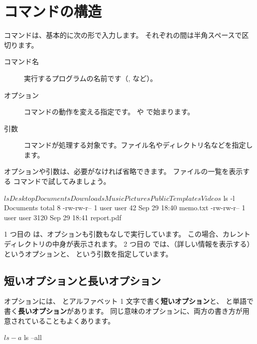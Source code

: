\section{コマンドの構造}
\label{sec:terminal-command-structure}

コマンドは、基本的に次の形で入力します。
それぞれの間は半角スペースで区切ります。
\begin{terminal}[コマンドの基本形]

\begin{description}
  \item[コマンド名] 実行するプログラムの名前です（,  など）。
  \item[オプション] コマンドの動作を変える指定です。\cmd{-} や \cmd{--} で始まります。
  \item[引数] コマンドが処理する対象です。ファイル名やディレクトリ名などを指定します。
\end{description}

オプションや引数は、必要がなければ省略できます。
ファイルの一覧を表示する  コマンドで試してみましょう。

\begin{terminal}[オプションと引数]
$ ls
Desktop  Documents  Downloads  Music  Pictures  Public  Templates  Videos
$ ls -l Documents
total 8
-rw-rw-r-- 1 user user   42 Sep 29 18:40 memo.txt
-rw-rw-r-- 1 user user 3120 Sep 29 18:41 report.pdf
\end{terminal}

1 つ目の  は、オプションも引数もなしで実行しています。
この場合、カレントディレクトリの中身が表示されます。
2 つ目の  では、（詳しい情報を表示する）というオプションと、 という引数を指定しています。

\subsection{短いオプションと長いオプション}

オプションには、\cmd{-} とアルファベット 1 文字で書く\textbf{短いオプション}と、\cmd{--} と単語で書く\textbf{長いオプション}があります。
同じ意味のオプションに、両方の書き方が用意されていることもよくあります。

\begin{terminal}[同じ意味の短いオプションと長いオプション]
$ ls -a
$ ls --all
\end{terminal}


\end{terminal}
